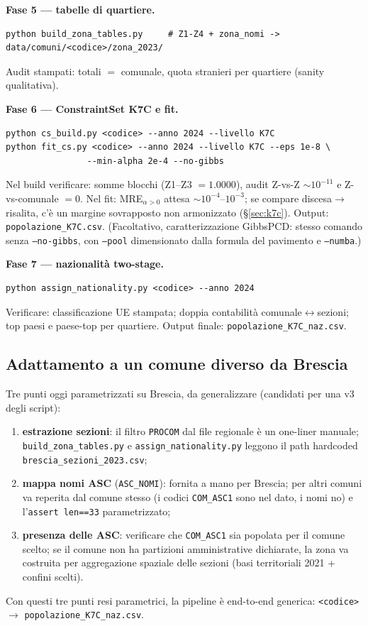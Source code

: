 \documentclass[11pt,a4paper]{article}
\newcommand{\code}[1]{\texttt{#1}}
\begin{document}
\medskip\noindent\textbf{Fase 5 --- tabelle di quartiere.}
\begin{lstlisting}
python build_zona_tables.py     # Z1-Z4 + zona_nomi -> data/comuni/<codice>/zona_2023/
\end{lstlisting}
Audit stampati: totali $=$ comunale, quota stranieri per quartiere (sanity
qualitativa).

\medskip\noindent\textbf{Fase 6 --- ConstraintSet K7C e fit.}
\begin{lstlisting}
python cs_build.py <codice> --anno 2024 --livello K7C
python fit_cs.py <codice> --anno 2024 --livello K7C --eps 1e-8 \
                --min-alpha 2e-4 --no-gibbs
\end{lstlisting}
Nel build verificare: somme blocchi (Z1--Z3 $=1.0000$), audit Z-vs-Z
$\sim10^{-11}$ e Z-vs-comunale $=0$. Nel fit: MRE$_{\alpha>0}$ attesa
$\sim10^{-4}$--$10^{-3}$; se compare discesa$\to$risalita, c'\`e un margine
sovrapposto non armonizzato (\S\ref{sec:k7c}). Output:
\code{popolazione\_K7C.csv}.
(Facoltativo, caratterizzazione GibbsPCD: stesso comando senza
\code{--no-gibbs}, con \code{--pool} dimensionato dalla formula del
pavimento e \code{--numba}.)

\medskip\noindent\textbf{Fase 7 --- nazionalit\`a two-stage.}
\begin{lstlisting}
python assign_nationality.py <codice> --anno 2024
\end{lstlisting}
Verificare: classificazione UE stampata; doppia contabilit\`a
comunale$\leftrightarrow$sezioni; top paesi e paese-top per quartiere.
Output finale: \code{popolazione\_K7C\_naz.csv}.

\subsection{Adattamento a un comune diverso da Brescia}
\label{sec:adapt}
Tre punti oggi parametrizzati su Brescia, da generalizzare (candidati per una
v3 degli script):
\begin{enumerate}[leftmargin=*,itemsep=1pt]
  \item \textbf{estrazione sezioni}: il filtro \code{PROCOM} dal file
  regionale \`e un one-liner manuale; \code{build\_zona\_tables.py} e
  \code{assign\_nationality.py} leggono il path hardcoded
  \code{brescia\_sezioni\_2023.csv};
  \item \textbf{mappa nomi ASC} (\code{ASC\_NOMI}): fornita a mano per
  Brescia; per altri comuni va reperita dal comune stesso (i codici
  \code{COM\_ASC1} sono nel dato, i nomi no) e l'\code{assert len==33}
  parametrizzato;
  \item \textbf{presenza delle ASC}: verificare che \code{COM\_ASC1} sia
  popolata per il comune scelto; se il comune non ha partizioni
  amministrative dichiarate, la zona va costruita per aggregazione
  spaziale delle sezioni (basi territoriali 2021 + confini scelti).
\end{enumerate}
Con questi tre punti resi parametrici, la pipeline \`e end-to-end generica:
\code{<codice>} $\to$ \code{popolazione\_K7C\_naz.csv}.
\end{document}
